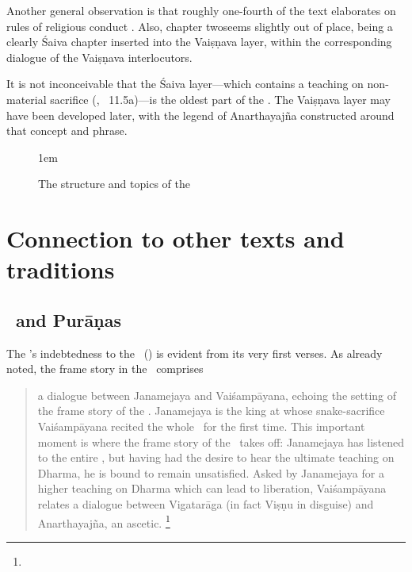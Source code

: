Another general observation is that roughly one-fourth 
of the text elaborates on rules of religious conduct
. Also, chapter two\linebreak seems slightly
out of place, being a clearly Śaiva chapter inserted
into the Vaiṣṇava layer, within the corresponding 
dialogue of the Vai\-ṣṇa\-va interlocutors.

It is not inconceivable that the Śaiva layer---which
contains a teaching on non-material sacrifice
(, \VSS\ 11.5a)---is
the oldest part of the \VSS. The Vaiṣṇava layer may have 
been developed later, with the legend of Anarthayajña
constructed around that concept and phrase.



\begin{figure}[p]

\begin{center}
\vspace{0em}
\leftskip1em
\end{center}

\caption[Structure and topics of the \VSS]{The structure and topics of the \VSS\ 
   \label{fig:structlotus}}
   
\end{figure}



\section{Connection to other texts and traditions}
\label{vss_connection_other_texts}
\subsection{\MBh\ and Purāṇas} 

The \VSS's indebtedness to the \MBh\ (\MBH) is evident 
from its very first verses. As already noted,
the frame story in the \VSS\ comprises

\begin{quote}
a dialogue between Janamejaya and Vaiśampāyana, 
echoing the setting of the frame story of the \MBh. 
Janamejaya is the king at whose snake-sacrifice 
Vaiśampāyana recited the whole \MBh\ for the first
time. This important moment is where the frame story 
of the \Vss\ takes off: Janamejaya has 
listened to the entire \MBh,
but having had the desire to hear the ultimate 
teaching on Dharma, he is bound to remain unsatisfied.
Asked by Janamejaya for a higher teaching
on Dharma which can lead to liberation, 
Vaiśampāyana relates a dialogue between Vigatarāga 
(in fact Viṣṇu in disguise) and Anarthayajña, an ascetic.%
				\footnote{}
\end{quote}
 
